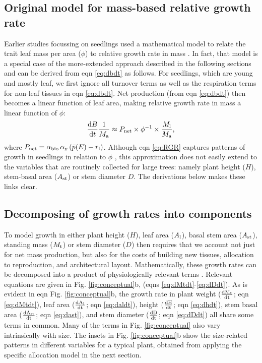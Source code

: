 \documentclass[a4paper,11pt]{article}
\begin{document}
\subsection{Original model for mass-based relative growth rate}

Earlier studies focussing on seedlings used a mathematical model to relate the trait leaf mass per area ($\phi$) to relative growth rate in mass \citep{Lambers-1992, Cornelissen-1996, Wright-2000}. In fact, that model is a special case of the more-extended approach described in the following sections and can be derived from eqn \ref{eq:dbdt} as follows. For seedlings, which are young and mostly leaf, we first ignore all turnover terms as well as the respiration terms for non-leaf tissues in eqn \ref{eq:dbdt}. Net production (from eqn \ref{eq:dbdt}) then becomes a linear function of leaf area, making relative growth rate in mass a linear function of $\phi$:
\begin{equation}\label{eq:RGR}
\frac{{\rm d}B}{{\rm d}t}\frac{1}{M_{\rm a}}  \approx P_{\rm net} \times \phi^{-1} \times \frac{M_{\rm l}}{M_{\rm a}}, \end{equation}
where $P_{\rm net} = \alpha_{\rm bio} \, \alpha_{\rm y}\,(\bar{p}(E) - r_{\rm l})$. Although eqn \ref{eq:RGR} captures patterns of growth in seedlings in relation to $\phi$ \citep{Wright-2000}, this approximation does not easily extend to the variables that are routinely collected for large trees: namely plant height ($H$), stem-basal area ($A_{\rm st}$) or stem diameter $D$. The derivations below makes these links clear.

\subsection{Decomposing of growth rates into components}

\setcounter{equation}{9}

To model growth in either plant height ($H$), leaf area ($A_{\rm l}$), basal stem area ($ A_{\rm st}$), standing mass ($M_{\rm t}$) or stem diameter ($D$) then requires that we account not just for net mass production, but also for the costs of building new tissues, allocation to reproduction, and architectural layout. Mathematically, these growth rates can be decomposed into a product of physiologically relevant terms \citep{Falster-2011, Gibert-2016}. Relevant equations are given in Fig. \ref{fig:conceptual}b, (eqns \ref{eq:dMtdt}-\ref{eq:dDdt}). As is evident in eqn  Fig. \ref{fig:conceptual}b, the growth rate in plant weight ($\frac{\rm{d} M_{\rm t} }{\rm{d} t}$; eqn \ref{eq:dMtdt}), leaf area ($\frac{\rm{d} A_{\rm l}}{\rm{d} t}$; eqn \ref{eq:daldt}), height ($\frac{\rm{d} H}{\rm{d} t}$; eqn \ref{eq:dhdt}), stem basal area ($\frac{\rm{d}  A_{\rm st}}{\rm{d} t}$; eqn \ref{eq:dast}), and stem diameter ($\frac{\rm{d} D}{\rm{d} t}$; eqn \ref{eq:dDdt}) all share some terms in common. Many of the terms in Fig. \ref{fig:conceptual} also vary intrinsically with size. The insets in Fig. \ref{fig:conceptual}b show the size-related patterns in different variables for a typical plant, obtained from applying the specific allocation model in the next section.
\end{document}
